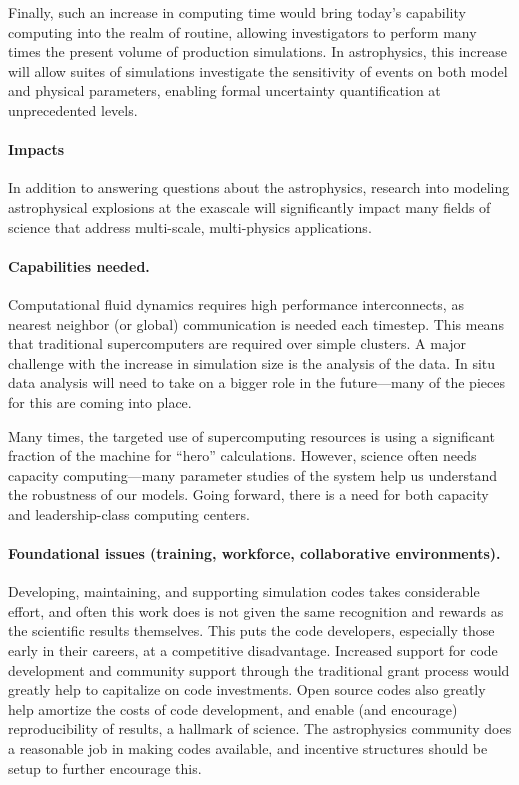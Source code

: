 \documentclass[11pt]{article}
\begin{document}
Finally, such an increase in computing time would bring today's
capability computing into the realm of routine, allowing investigators
to perform many times the present volume of production simulations.
In astrophysics, this increase will allow suites of simulations 
investigate the sensitivity of events on both model and physical
parameters, enabling formal uncertainty quantification at 
unprecedented levels.

\paragraph*{Impacts} In addition to answering questions about the 
astrophysics, research into modeling astrophysical explosions
at the exascale will significantly impact many fields of science 
that address multi-scale, multi-physics applications. 


\paragraph*{Capabilities needed.}  Computational fluid dynamics requires 
high performance interconnects, as nearest neighbor (or global)
communication is needed each timestep.  This means that traditional
supercomputers are required over simple clusters.  A major challenge
with the increase in simulation size is the analysis of the data.  In
situ data analysis will need to take on a bigger role in the future---many
of the pieces for this are coming into place.

Many times, the targeted use of supercomputing resources is using a
significant fraction of the machine for ``hero'' calculations.
However, science often needs capacity computing---many parameter
studies of the system help us understand the robustness of our models.
Going forward, there is a need for both capacity and leadership-class
computing centers.


\paragraph*{Foundational issues (training, workforce, collaborative environments).}

Developing, maintaining, and supporting simulation codes takes
considerable effort, and often this work does is not given the same
recognition and rewards as the scientific results themselves.  This
puts the code developers, especially those early in their careers, at
a competitive disadvantage. Increased support for code development and
community support through the traditional grant process would greatly
help to capitalize on code investments.  Open source codes also greatly
help amortize the costs of code development, and enable (and
encourage) reproducibility of results, a hallmark of science.  The
astrophysics community does a reasonable job in making codes available, and
incentive structures should be setup to further encourage this.
\end{document}
